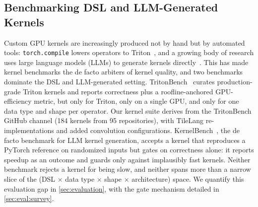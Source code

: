 \subsection{Benchmarking DSL and LLM-Generated Kernels}
\label{sec:bg:tritonbench}
Custom GPU kernels are increasingly produced not by hand but by automated tools: \texttt{torch.compile} lowers operators to Triton~\cite{li2023torchcompile}, and a growing body of research uses large language models (LLMs) to generate kernels directly~\cite{kernelbench,li2025tritonforge}.
This has made kernel benchmarks the de facto arbiters of kernel quality, and two benchmarks dominate the DSL and LLM-generated setting.
TritonBench~\cite{li2025tritonbench} curates production-grade Triton kernels and reports correctness plus a roofline-anchored GPU-efficiency metric, but only for Triton, only on a single GPU, and only for one data type and shape per operator. Our kernel suite derives from the TritonBench GitHub channel (184 kernels from 95 repositories), with TileLang re-implementations and added convolution configurations.
KernelBench~\cite{kernelbench}, the de facto benchmark for LLM kernel generation, accepts a kernel that reproduces a PyTorch reference on randomized inputs but gates on correctness alone: it reports speedup as an outcome and guards only against implausibly fast kernels.
Neither benchmark rejects a kernel for being slow, and neither spans more than a narrow slice of the (DSL $\times$ data type $\times$ shape $\times$ architecture) space. %
We quantify this evaluation gap in \cref{sec:evaluation}, with the gate mechanism detailed in \cref{sec:eval:survey}.